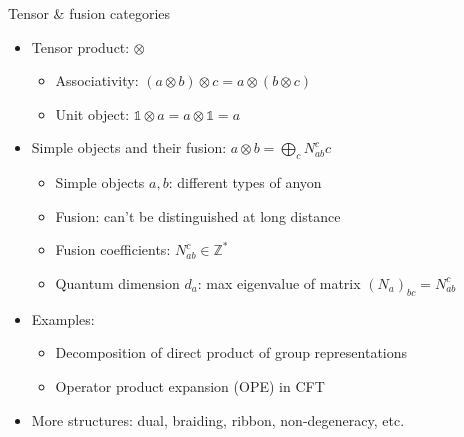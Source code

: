 \documentclass{fdubeamer}
\newcommand{\1}{\mathbb{1}}
\begin{document}
\begin{frame}{Tensor \& fusion categories}

\begin{itemize}
  \item Tensor product: $\otimes$

    \begin{itemize}
      \item Associativity: $(a\otimes b)\otimes c=a\otimes(b\otimes c)$
      \item Unit object: $\1\otimes a=a\otimes\1=a$
    \end{itemize}

  \item Simple objects and their fusion: $a\otimes b=\bigoplus_c N_{ab}^c c$

    \begin{itemize}
      \item Simple objects $a,b$: different types of anyon
      \item Fusion: can't be distinguished at long distance
      \item Fusion coefficients: $N_{ab}^c\in\mathbb{Z}^*$
      \item Quantum dimension $d_a$: max eigenvalue of matrix $(N_a)_{bc}=N_{ab}^c$
    \end{itemize}

  \item Examples:

    \begin{itemize}
      \item Decomposition of direct product of group representations
      \item Operator product expansion (OPE) in CFT
    \end{itemize}

  \item More structures: dual, braiding, ribbon, non-degeneracy, etc.
\end{itemize}

\end{frame}
\end{document}
